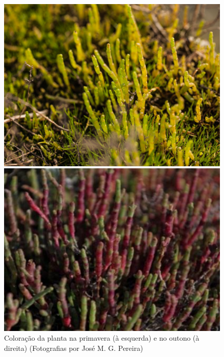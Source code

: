 \begin{figure}[h]
	\centering
	\begin{minipage}[b]{0.49\textwidth}
		\includegraphics[width=\textwidth]{img/cap2-sali/Salicornia04.JPG}
	\end{minipage}
	\hfill
	\begin{minipage}[b]{0.49\textwidth}
		\includegraphics[width=\textwidth]{img/cap2-sali/sal-outono.png}
	\end{minipage}
	\caption[Coloração da planta \sr \space na primavera (à esquerda) e no outono (à direita)]{Coloração da planta \sr \space na primavera (à esquerda) e no outono (à direita) (Fotografias por José M. G. Pereira)}
	\label{primoutono}
\end{figure}



